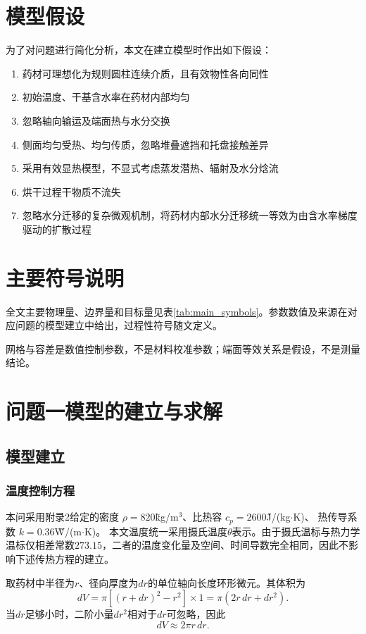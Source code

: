 \documentclass[withoutpreface]{cumcmthesis}
\begin{document}
\section{模型假设}
为了对问题进行简化分析，本文在建立模型时作出如下假设：
\begin{enumerate}[label=(\arabic*)]
	\item 药材可理想化为规则圆柱连续介质，且有效物性各向同性
	\item 初始温度、干基含水率在药材内部均匀
	\item 忽略轴向输运及端面热与水分交换
	\item 侧面均匀受热、均匀传质，忽略堆叠遮挡和托盘接触差异
	\item 采用有效显热模型，不显式考虑蒸发潜热、辐射及水分焓流
	\item 烘干过程干物质不流失
	\item 忽略水分迁移的复杂微观机制，将药材内部水分迁移统一等效为由含水率梯度驱动的扩散过程
	
\end{enumerate}
\section{主要符号说明}
全文主要物理量、边界量和目标量见表\ref{tab:main_symbols}。参数数值及来源在对应问题的模型建立中给出，过程性符号随文定义。

网格与容差是数值控制参数，不是材料校准参数；端面等效关系是假设，不是测量结论。



\section{问题一模型的建立与求解}
\subsection{模型建立}\label{sec:q1model}
\subsubsection{温度控制方程}

本问采用附录2给定的密度
$\rho=820$\~kg/m$^3$、比热容
$c_p=2600$\~J/(kg$\cdot$K)、
热传导系数
$k=0.36$\~W/(m$\cdot$K)。
本文温度统一采用摄氏温度$\theta$表示。由于摄氏温标与热力学温标仅相差常数$273.15$，二者的温度变化量及空间、时间导数完全相同，因此不影响下述传热方程的建立。

取药材中半径为$r$、径向厚度为$dr$的单位轴向长度环形微元。其体积为
\[
dV
=
\pi\left[(r+dr)^2-r^2\right]\times1
=
\pi(2r\,dr+dr^2).
\]
当$dr$足够小时，二阶小量$dr^2$相对于$dr$可忽略，因此
\[
dV\approx2\pi r\,dr.
\]
\end{document}
